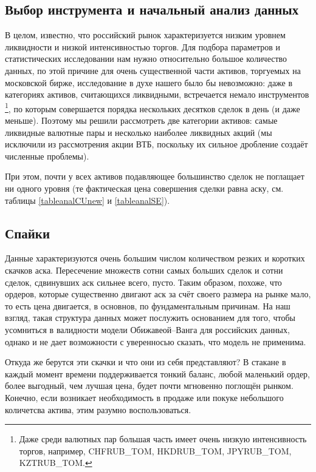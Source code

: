 \subsection{Выбор инструмента и начальный анализ данных} \label{InitAnal}
В целом, известно, что российский рынок характеризуется низким уровнем ликвидности и низкой интенсивностью торгов. 
Для подбора параметров и статистических исследовании
нам нужно относительно большое количество данных, по этой причине
для очень существенной части активов, торгуемых на московской бирже, 
исследование в духе нашего было бы невозможно: даже в категориях 
активов, считающихся ликвидными,
встречается немало инструментов \footnote{Даже среди валютных пар большая 
часть имеет очень низкую интенсивность торгов, например, CHFRUB\_TOM, HKDRUB\_TOM, 
JPYRUB\_TOM, KZTRUB\_TOM.}, по которым совершается порядка нескольких десятков сделок в день (и даже меньше). 
Поэтому мы решили рассмотреть две категории активов: самые ликвидные валютные пары
и несколько наиболее ликвидных акций (мы исключили из рассмотрения акции ВТБ, поскольку их сильное дробление создаёт 
численные проблемы).
\par
При этом, почти у всех активов подавляющее большинство сделок не поглащает ни одного уровня 
(те фактическая цена совершения сделки равна аску, см. таблицы \ref{tableanalCUnew} и \ref{tableanalSE}). 
\par


\subsection{Спайки}

Данные характеризуются очень большим числом количеством резких и коротких скачков аска. 
Пересечение множеств
сотни самых больших сделок и сотни сделок, сдвинувших аск сильнее всего, пусто. Таким образом, похоже, что ордеров,
которые существенно двигают аск за счёт своего размера на рынке мало, то есть цена двигается, в основнов, по фундаментальным причинам.
На наш взгляд, такая структура данных может послужить основанием для того, чтобы усомниться в валидности модели Обижавеой--Ванга 
для российских данных, однако и не дает возможности с уверенносью сказать, что модель не применима. 
\par
Откуда же берутся эти скачки и что они из себя представляют? В стакане в каждый момент времени поддерживается тонкий баланс, любой
маленький ордер, более выгодный, чем лучшая цена, будет почти мгновенно поглощён рынком. Конечно, если возникает необходимость в продаже
или покуке небольшого количетсва актива, этим разумно воспользоваться.

